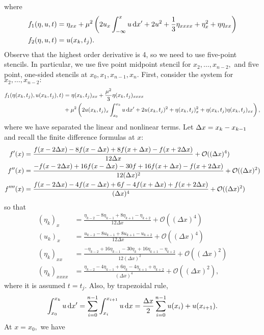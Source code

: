 \documentclass[10pt,reqno,oneside,a4paper]{article}
\begin{document}
where 
\begin{align*}
f_1(\eta, u, t) &= \eta_{xx} + \mu^2 \left( 2 u_{x} \int^{x}_{-\infty} u \,\mathrm{d} x' +2 u^2 + \frac{1}{3} \eta_{xxxx} + \eta^2_x + \eta\eta_{xx} \right) \\
f_2(\eta, u, t) &= u(x_k, t_j).
\end{align*}
Observe that the highest order derivative is 4, so we need to use five-point stencils. In particular, we use five point midpoint stencil for $x_2, \ldots, x_{n-2},$ and five point, one-sided stencils at $x_0, x_1, x_{n-1}, x_n.$ First, consider the system for $x_2, \ldots, x_{n-2}:$
\begin{align*}
f_1(\eta(x_k, t_j), u(x_k, t_j), t) &= \eta(x_k, t_j)_{xx} + \frac{\mu^2}{3} \eta(x_k, t_j)_{xxxx} \\
&+ \mu^2 \left( 2 u(x_k, t_j)_{x} \int^{x_k}_{x_0} u \,\mathrm{d} x' +2 u(x_k, t_j)^2 + \eta(x_k, t_j)^2_x + \eta(x_k, t_j)\eta(x_k, t_j)_{xx} \right),
\end{align*}
where we have separated the linear and nonlinear terms.
Let $\Delta x = x_k - x_{k-1}$ and recall the finite difference formulas at $x:$
\begin{align*}
f'(x)&= \frac{f(x- 2\Delta x ) - 8 f(x-\Delta x) + 8f(x+ \Delta x) - f(x+2\Delta x) }{12\Delta x} + \mathcal{O}((\Delta x)^4) \\
f''(x)&= \frac{-f(x- 2\Delta x ) +16 f(x-\Delta x) - 30f+16f(x+ \Delta x) - f(x+2\Delta x)}{12(\Delta x)^2} + \mathcal{O}((\Delta x)^2) \\
f''''(x)&= \frac{f(x- 2\Delta x ) -4 f(x-\Delta x) + 6f - 4f(x+ \Delta x) + f(x+2\Delta x)}{(\Delta x)^4} + \mathcal{O}((\Delta x)^2)
\end{align*}
so that 
\begin{align*}
(\eta_k)_x&= \frac{\eta_{k-2} - 8 \eta_{k-1} + 8\eta_{k+1} - \eta_{k+2}}{12\Delta x} + \mathcal{O}((\Delta x)^4) \\
(u_k)_x&= \frac{u_{k-2} - 8 u_{k-1} + 8u_{k+1} - u_{k+2} }{12\Delta x} + \mathcal{O}((\Delta x)^4) \\
(\eta_k)_{xx} &= \frac{-\eta_{k-2} +16 \eta_{k-1} - 30\eta_k+16\eta_{k+1} - \eta_{k+2}}{12(\Delta x)^2} + \mathcal{O}((\Delta x)^2) \\
(\eta_k)_{xxxx} &= \frac{\eta_{k-2} -4 \eta_{k-1} + 6\eta_k - 4\eta_{k+1} + \eta_{k+2}}{(\Delta x)^4} + \mathcal{O}((\Delta x)^2),
\end{align*}
where it is assumed $t = t_j.$ Also, by trapezoidal rule, 
\[ 
\int^{x_k}_{x_0} u \,\mathrm{d} x' = \sum_{i=0}^{n-1} \int^{x_{i+1}}_{x_{i}} u \,\mathrm{d} x = \frac{\Delta x}{2} \sum_{i=0}^{n-1} u(x_i) + u(x_{i+1}).
\]
At $x = x_0,$ we have 
\end{document}
